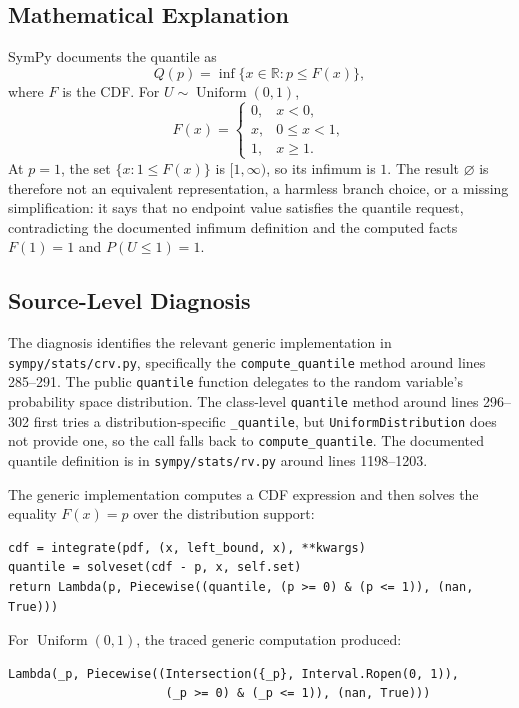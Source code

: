 \documentclass[11pt]{article}
\begin{document}
\subsection{Mathematical Explanation}

SymPy documents the quantile as
\[
Q(p) = \inf\{x \in \mathbb{R} : p \leq F(x)\},
\]
where \(F\) is the CDF.  For \(U \sim \operatorname{Uniform}(0,1)\),
\[
F(x) =
\begin{cases}
0, & x < 0,\\
x, & 0 \leq x < 1,\\
1, & x \geq 1.
\end{cases}
\]
At \(p = 1\), the set \(\{x : 1 \leq F(x)\}\) is \([1,\infty)\), so its infimum is \(1\).  The result \(\varnothing\) is therefore not an equivalent representation, a harmless branch choice, or a missing simplification: it says that no endpoint value satisfies the quantile request, contradicting the documented infimum definition and the computed facts \(F(1)=1\) and \(P(U \leq 1)=1\).

\subsection{Source-Level Diagnosis}

The diagnosis identifies the relevant generic implementation in \nolinkurl{sympy/stats/crv.py}, specifically the \texttt{compute\_quantile} method around lines 285--291.  The public \texttt{quantile} function delegates to the random variable's probability space distribution.  The class-level \texttt{quantile} method around lines 296--302 first tries a distribution-specific \texttt{\_quantile}, but \texttt{UniformDistribution} does not provide one, so the call falls back to \texttt{compute\_quantile}.  The documented quantile definition is in \nolinkurl{sympy/stats/rv.py} around lines 1198--1203.

The generic implementation computes a CDF expression and then solves the equality \(F(x)=p\) over the distribution support:

\begin{lstlisting}[style=bugpython]
cdf = integrate(pdf, (x, left_bound, x), **kwargs)
quantile = solveset(cdf - p, x, self.set)
return Lambda(p, Piecewise((quantile, (p >= 0) & (p <= 1)), (nan, True)))
\end{lstlisting}

For \(\operatorname{Uniform}(0,1)\), the traced generic computation produced:

\begin{lstlisting}[style=bugpython]
Lambda(_p, Piecewise((Intersection({_p}, Interval.Ropen(0, 1)),
                      (_p >= 0) & (_p <= 1)), (nan, True)))
\end{lstlisting}
\end{document}
